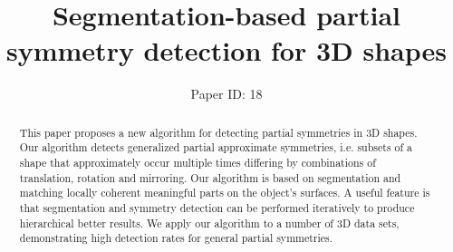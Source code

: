 \documentclass[twocolumn]{svjour3}          %
\begin{document}
\title{Segmentation-based partial symmetry detection for 3D shapes}
\subtitle{}
\author{Paper ID: 18}
\institute{}
\date{ }%

\maketitle

\begin{abstract}
This paper proposes a new algorithm for detecting partial symmetries in 3D shapes.
Our algorithm detects generalized partial approximate symmetries, i.e. subsets of a shape that
approximately occur multiple times differing by combinations of translation, rotation and mirroring.
Our algorithm is based on segmentation and matching locally coherent meaningful parts on the object's surfaces.
A useful feature is that segmentation and symmetry detection can be performed iteratively to produce hierarchical better results.
We apply our algorithm to a number of 3D data sets, demonstrating high detection rates for general partial symmetries.

\end{abstract}









\end{document}
